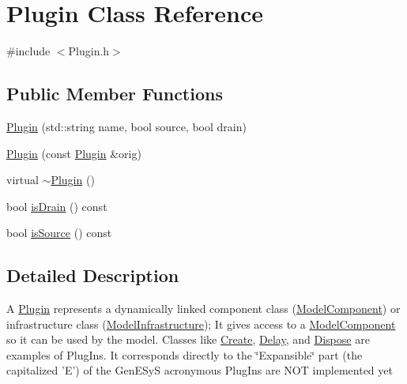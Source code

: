 \hypertarget{class_plugin}{\section{Plugin Class Reference}
\label{class_plugin}
}


{\ttfamily \#include $<$Plugin.\-h$>$}

\subsection*{Public Member Functions}
\begin{DoxyCompactItemize}
\item 
\hyperlink{class_plugin_a1180a8be15f3a920f1044e528d807ea1}{Plugin} (std\-::string name, bool source, bool drain)
\item 
\hyperlink{class_plugin_acececc8908162c6b0c883e62995abad8}{Plugin} (const \hyperlink{class_plugin}{Plugin} \&orig)
\item 
virtual \hyperlink{class_plugin_aee4cc1864a2afa84a9ad935153f3fe39}{$\sim$\-Plugin} ()
\item 
bool \hyperlink{class_plugin_a1f1610d1eee7009dedf030f8495ab748}{is\-Drain} () const 
\item 
bool \hyperlink{class_plugin_a87ed4a6c7eab8e84a650c4e057f15dd1}{is\-Source} () const 
\end{DoxyCompactItemize}


\subsection{Detailed Description}
A \hyperlink{class_plugin}{Plugin} represents a dynamically linked component class (\hyperlink{class_model_component}{Model\-Component}) or infrastructure class (\hyperlink{class_model_infrastructure}{Model\-Infrastructure}); It gives access to a \hyperlink{class_model_component}{Model\-Component} so it can be used by the model. Classes like \hyperlink{class_create}{Create}, \hyperlink{class_delay}{Delay}, and \hyperlink{class_dispose}{Dispose} are examples of Plug\-Ins. It corresponds directly to the \char`\"{}\-Expansible\char`\"{} part (the capitalized 'E') of the Gen\-E\-Sy\-S acronymous Plug\-Ins are N\-O\-T implemented yet 

